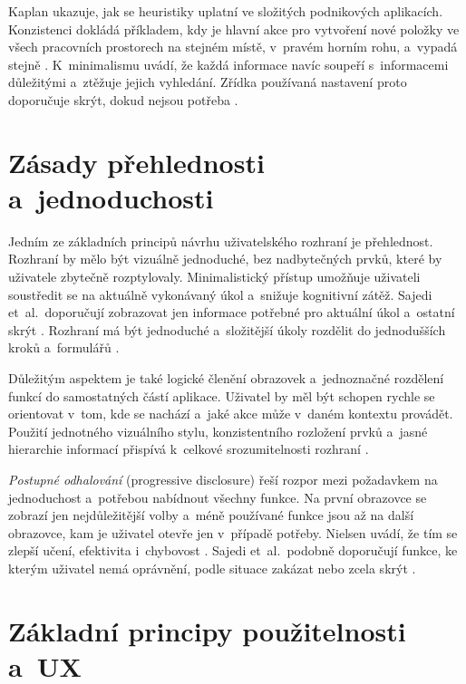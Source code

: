 Kaplan ukazuje, jak se heuristiky uplatní ve složitých podnikových aplikacích. Konzistenci dokládá příkladem, kdy je hlavní akce pro vytvoření nové položky ve všech pracovních prostorech na stejném místě, v~pravém horním rohu, a~vypadá stejně \cite{Kaplan2021}. K~minimalismu uvádí, že každá informace navíc soupeří s~informacemi důležitými a~ztěžuje jejich vyhledání. Zřídka používaná nastavení proto doporučuje skrýt, dokud nejsou potřeba \cite{Kaplan2021}.

\section{Zásady přehlednosti a~jednoduchosti}\label{sec:ui-prehlednost}

Jedním ze základních principů návrhu uživatelského rozhraní je přehlednost. Rozhraní by mělo být vizuálně jednoduché, bez nadbytečných prvků, které by uživatele zbytečně rozptylovaly. Minimalistický přístup umožňuje uživateli soustředit se na aktuálně vykonávaný úkol a~snižuje kognitivní zátěž. Sajedi et~al.\ doporučují zobrazovat jen informace potřebné pro aktuální úkol a~ostatní skrýt \cite[s.~2332]{Sajedi2011}. Rozhraní má být jednoduché a~složitější úkoly rozdělit do jednodušších kroků a~formulářů \cite[s.~2330]{Sajedi2011}.

Důležitým aspektem je také logické členění obrazovek a~jednoznačné rozdělení funkcí do samostatných částí aplikace. Uživatel by měl být schopen rychle se orientovat v~tom, kde se nachází a~jaké akce může v~daném kontextu provádět. Použití jednotného vizuálního stylu, konzistentního rozložení prvků a~jasné hierarchie informací přispívá k~celkové srozumitelnosti rozhraní \cite[s.~2328]{Sajedi2011}.

\emph{Postupné odhalování} (progressive disclosure) řeší rozpor mezi požadavkem na jednoduchost a~potřebou nabídnout všechny funkce. Na první obrazovce se zobrazí jen nejdůležitější volby a~méně používané funkce jsou až na další obrazovce, kam je uživatel otevře jen v~případě potřeby. Nielsen uvádí, že tím se zlepší učení, efektivita i~chybovost \cite{Nielsen-progressive}. Sajedi et~al.\ podobně doporučují funkce, ke kterým uživatel nemá oprávnění, podle situace zakázat nebo zcela skrýt \cite[s.~2331]{Sajedi2011}.

\section{Základní principy použitelnosti a~UX}\label{sec:ui-principy}

